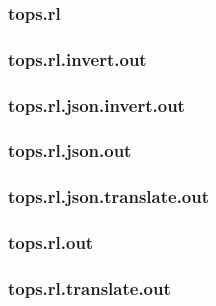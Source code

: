 \subsubsection{tops.rl}
\label{app:tops_rl}

\subsubsection{tops.rl.invert.out}
\label{app:tops_rl.invert.out}

\subsubsection{tops.rl.json.invert.out}
\label{app:tops_rl.json.invert.out}

\subsubsection{tops.rl.json.out}
\label{app:tops_rl.json.out}

\subsubsection{tops.rl.json.translate.out}
\label{app:tops_rl.json.translate.out}

\subsubsection{tops.rl.out}
\label{app:tops_rl.out}

\subsubsection{tops.rl.translate.out}
\label{app:tops_rl.translate.out}

